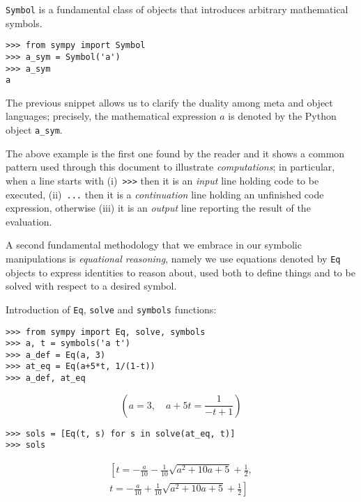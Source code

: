 \begin{example}
\verb|Symbol| is a fundamental class of objects that introduces arbitrary
mathematical symbols.
\begin{verbatim}
>>> from sympy import Symbol
>>> a_sym = Symbol('a')
>>> a_sym
a
\end{verbatim}
The previous snippet allows us to clarify the duality among meta and object
languages; precisely, the mathematical expression $a$ is denoted by the Python
object \verb|a_sym|.
\end{example}

The above example is the first one found by the reader and it shows a common
pattern used through this document to illustrate \textit{computations}; in
particular, when a line starts with (i)~\verb|>>>| then it is an \textit{input}
line holding code to be executed, (ii)~\verb|...| then it is a
\textit{continuation} line holding an unfinished code expression, otherwise
(iii) it is an \textit{output} line reporting the result of the evaluation.

A second fundamental methodology that we embrace in our symbolic manipulations is
\textit{equational reasoning}, namely we use equations denoted by \verb|Eq| objects
to express identities to reason about, used both to define things and
to be solved with respect to a desired symbol.
\begin{example}
Introduction of \verb|Eq|, \verb|solve| and \verb|symbols| functions:
\begin{verbatim}
>>> from sympy import Eq, solve, symbols
>>> a, t = symbols('a t')
>>> a_def = Eq(a, 3)
>>> at_eq = Eq(a+5*t, 1/(1-t))
>>> a_def, at_eq
\end{verbatim}
\begin{displaymath}
\left(
a=3,\quad a + 5 t = \frac{1}{- t + 1}
\right)
\end{displaymath}
\begin{verbatim}
>>> sols = [Eq(t, s) for s in solve(at_eq, t)]
>>> sols
\end{verbatim}
\begin{displaymath}
\begin{array}{c}
\left [ t = - \frac{a}{10} - \frac{1}{10} \sqrt{a^{2} + 10 a + 5} + \frac{1}{2}, \right . \\
\left. t = - \frac{a}{10} + \frac{1}{10} \sqrt{a^{2} + 10 a + 5} + \frac{1}{2}\right ]
\end{array}
\end{displaymath}
\end{example}

